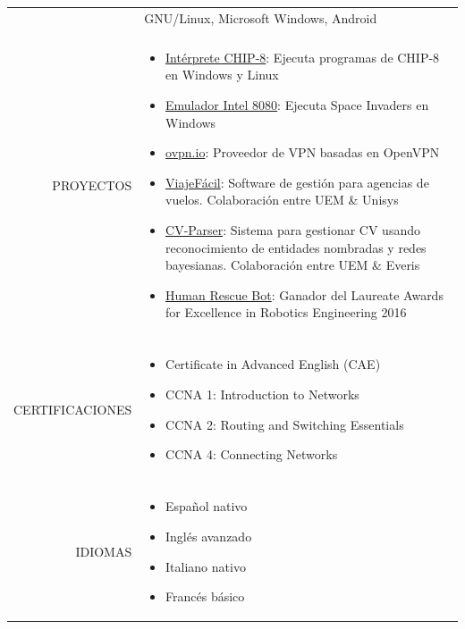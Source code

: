 \documentclass[a4paper, 11pt]{article}
\begin{document}
\begin{longtable}{rp{11cm}}
        & GNU/Linux, Microsoft Windows, Android\\
        \\
        PROYECTOS
        & \vspace{-8mm}
        \begin{itemize}[leftmargin=0cm,label={}]
            \item \href{https://github.com/hugo19941994/CHIP8-Emu}{Intérprete CHIP-8}: Ejecuta programas de CHIP-8 en Windows y Linux
            \item \href{https://github.com/hugo19941994/SpaceInvaders-Emu}{Emulador Intel 8080}: Ejecuta Space Invaders en Windows
            \item \href{https://ovpn.io}{ovpn.io}: Proveedor de VPN basadas en OpenVPN
            \item \href{https://github.com/hugo19941994/ViajeFacil}{ViajeFácil}: Software de gestión para agencias de vuelos. Colaboración entre UEM \& Unisys
            \item \href{https://github.com/hugo19941994/CV-Parser}{CV-Parser}: Sistema para gestionar CV usando reconocimiento de entidades nombradas y redes bayesianas. Colaboración entre UEM \& Everis
            \item \href{https://github.com/hugo19941994/robot}{Human Rescue Bot}: Ganador del Laureate Awards for Excellence in Robotics Engineering 2016
        \end{itemize}\\
        \\
        CERTIFICACIONES
        & \vspace{-8mm}
        \begin{itemize}[leftmargin=0cm,label={},noitemsep]
            \item Certificate in Advanced English (CAE)
            \item CCNA 1: Introduction to Networks
            \item CCNA 2: Routing and Switching Essentials
            \item CCNA 4: Connecting Networks
        \end{itemize}\\
        \\
        IDIOMAS
        & \vspace{-8mm}
        \begin{itemize}[leftmargin=0cm,label={},noitemsep]
            \item Español nativo
            \item Inglés avanzado
            \item Italiano nativo
            \item Francés básico
        \end{itemize}
    \end{longtable}
\end{document}
